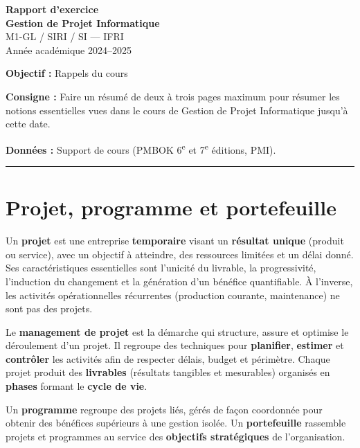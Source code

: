 \documentclass[11pt,a4paper]{article}
\begin{document}
\begin{center}
    {\LARGE \textbf{Rapport d'exercice}}\\[0.6em]
    {\large \textbf{Gestion de Projet Informatique}}\\[0.4em]
    {\normalsize M1-GL / SIRI / SI --- IFRI}\\[0.3em]
    {\normalsize Année académique 2024--2025}
\end{center}

\vspace{0.5em}
\noindent\textbf{Objectif :} Rappels du cours

\noindent\textbf{Consigne :} Faire un résumé de deux à trois pages maximum pour résumer les notions essentielles vues dans le cours de Gestion de Projet Informatique jusqu'à cette date.

\noindent\textbf{Données :} Support de cours (PMBOK\textsuperscript{\textregistered} 6\textsuperscript{e} et 7\textsuperscript{e} éditions, PMI).

\vspace{0.8em}
\hrule
\vspace{0.8em}

\section{Projet, programme et portefeuille}

Un \textbf{projet} est une entreprise \textbf{temporaire} visant un \textbf{résultat unique} (produit ou service), avec un objectif à atteindre, des ressources limitées et un délai donné. Ses caractéristiques essentielles sont l'unicité du livrable, la progressivité, l'induction du changement et la génération d'un bénéfice quantifiable. À l'inverse, les activités opérationnelles récurrentes (production courante, maintenance) ne sont pas des projets.

Le \textbf{management de projet} est la démarche qui structure, assure et optimise le déroulement d'un projet. Il regroupe des techniques pour \textbf{planifier}, \textbf{estimer} et \textbf{contrôler} les activités afin de respecter délais, budget et périmètre. Chaque projet produit des \textbf{livrables} (résultats tangibles et mesurables) organisés en \textbf{phases} formant le \textbf{cycle de vie}.

Un \textbf{programme} regroupe des projets liés, gérés de façon coordonnée pour obtenir des bénéfices supérieurs à une gestion isolée. Un \textbf{portefeuille} rassemble projets et programmes au service des \textbf{objectifs stratégiques} de l'organisation.
\end{document}
